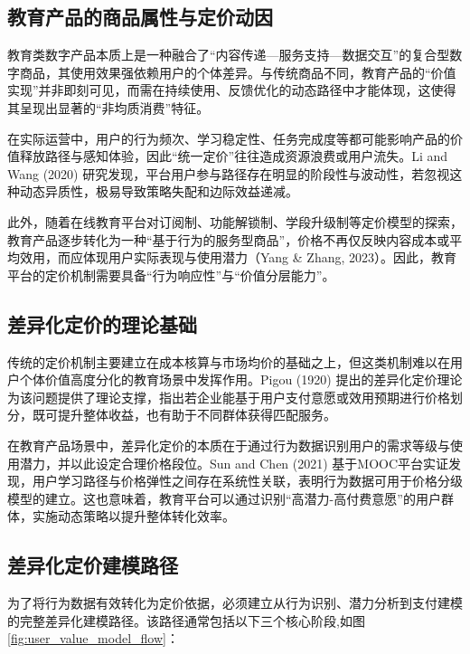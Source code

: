 \subsection{教育产品的商品属性与定价动因}

教育类数字产品本质上是一种融合了“内容传递—服务支持—数据交互”的复合型数字商品，其使用效果强依赖用户的个体差异。与传统商品不同，教育产品的“价值实现”并非即刻可见，而需在持续使用、反馈优化的动态路径中才能体现，这使得其呈现出显著的“非均质消费”特征\cite{zhang2021educationalproduct}。

在实际运营中，用户的行为频次、学习稳定性、任务完成度等都可能影响产品的价值释放路径与感知体验，因此“统一定价”往往造成资源浪费或用户流失。Li and Wang (2020) 研究发现，平台用户参与路径存在明显的阶段性与波动性，若忽视这种动态异质性，极易导致策略失配和边际效益递减。

此外，随着在线教育平台对订阅制、功能解锁制、学段升级制等定价模型的探索，教育产品逐步转化为一种“基于行为的服务型商品”，价格不再仅反映内容成本或平均效用，而应体现用户实际表现与使用潜力（Yang \& Zhang, 2023）。因此，教育平台的定价机制需要具备“行为响应性”与“价值分层能力”。

\subsection{差异化定价的理论基础}

传统的定价机制主要建立在成本核算与市场均价的基础之上，但这类机制难以在用户个体价值高度分化的教育场景中发挥作用。Pigou (1920) 提出的差异化定价理论为该问题提供了理论支撑，指出若企业能基于用户支付意愿或效用预期进行价格划分，既可提升整体收益，也有助于不同群体获得匹配服务。

在教育产品场景中，差异化定价的本质在于通过行为数据识别用户的需求等级与使用潜力，并以此设定合理价格段位。Sun and Chen (2021) 基于MOOC平台实证发现，用户学习路径与价格弹性之间存在系统性关联，表明行为数据可用于价格分级模型的建立。这也意味着，教育平台可以通过识别“高潜力-高付费意愿”的用户群体，实施动态策略以提升整体转化效率。

\subsection{差异化定价建模路径}

为了将行为数据有效转化为定价依据，必须建立从行为识别、潜力分析到支付建模的完整差异化建模路径。该路径通常包括以下三个核心阶段,如图\ref{fig:user_value_model_flow}：


